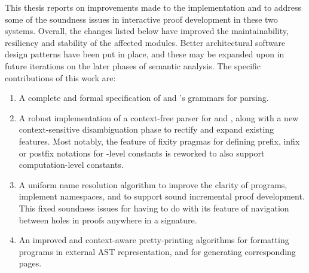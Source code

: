 
This thesis reports on improvements made to the implementation \Beluga and \Harpoon to address some of the soundness issues in interactive proof development in these two systems.
Overall, the changes listed below have improved the maintainability, resiliency and stability of the affected modules.
Better architectural software design patterns have been put in place, and these may be expanded upon in future iterations on the later phases of semantic analysis.
The specific contributions of this work are:
\begin{enumerate}
\item
A complete and formal specification of \Beluga and \Harpoon's grammars for parsing.
\item
A robust implementation of a context-free parser for \Beluga and \Harpoon, along with a new context-sensitive disambiguation phase to rectify and expand existing features.
Most notably, the \Beluga feature of fixity pragmas for defining prefix, infix or postfix notations for \LF-level constants is reworked to also support computation-level constants.
\item
A uniform name resolution algorithm to improve the clarity of \Beluga programs, implement namespaces, and to support sound incremental proof development.
This fixed soundness issues for \Harpoon having to do with its feature of navigation between holes in proofs anywhere in a \Beluga signature.
\item
An improved and context-aware pretty-printing algorithms for formatting \Beluga programs in external \ac{AST} representation, and for generating corresponding \HTML pages.
\end{enumerate}

